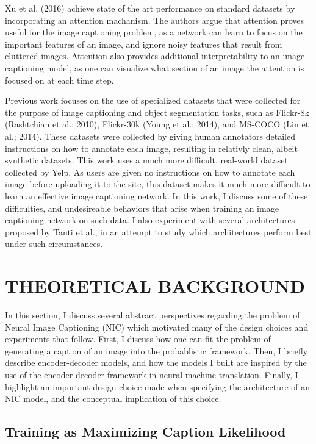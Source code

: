 \documentclass[letterpaper, 10 pt, conference]{ieeeconf}
\begin{document}
Xu et al. (2016) achieve state of the art performance on standard datasets by incorporating an attention machanism. The authors argue that attention proves useful for the image captioning problem, as a network can learn to focus on the important features of an image, and ignore noisy features that result from cluttered images. Attention also provides additional interpretability to an image captioning model, as one can visualize what section of an image the attention is focused on at each time step. 

Previous work focuses on the use of specialized datasets that were collected for the purpose of image captioning and object segmentation tasks, such as Flickr-8k (Rashtchian et al.; 2010), Flickr-30k (Young et al.; 2014), and MS-COCO (Lin et al.; 2014). These datasets were collected by giving human annotators detailed instructions on how to annotate each image, resulting in relativly clean, albeit synthetic datasets. This work uses a much more difficult, real-world dataset collected by Yelp. As users are given no instructions on how to annotate each image before uploading it to the site, this dataset makes it much more difficult to learn an effective image captioning network. In this work, I discuss some of these difficulties, and undesireable behaviors that arise when training an image captioning network on such data. I also experiment with several architectures proposed by Tanti et al., in an attempt to study which architectures perform best under such circumstances.


\section{THEORETICAL BACKGROUND}

In this section, I discuss several abstract perspectives regarding the problem of Neural Image Captioning (NIC) which motivated many of the design choices and experiments that follow. First, I discuss how one can fit the problem of generating a caption of an image into the probablistic framework. Then, I briefly describe encoder-decoder models, and how the models I built are inspired by the use of the encoder-decoder  framework in neural machine translation. Finally, I highlight an important design choice made when specifying the architecture of an NIC model, and the conceptual implication of this choice. 

\subsection{Training as Maximizing Caption Likelihood}
\end{document}
